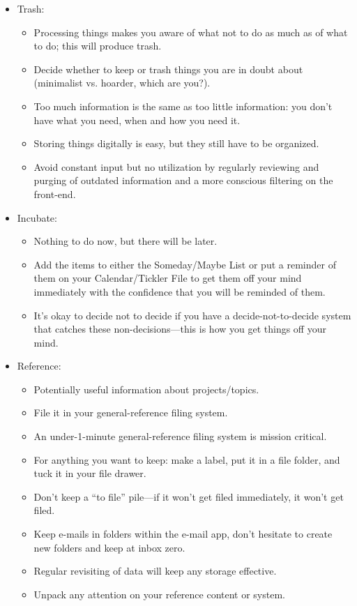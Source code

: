 \documentclass{article}
\begin{document}
\begin{itemize}
  \item Trash:
  \begin{itemize}
    \item Processing things makes you aware of what not to do as much as of what to do; this will produce trash.
    \item Decide whether to keep or trash things you are in doubt about (minimalist vs. hoarder, which are you?).
    \item Too much information is the same as too little information: you don't have what you need, when and how you need it.
    \item Storing things digitally is easy, but they still have to be organized.
    \item Avoid constant input but no utilization by regularly reviewing and purging of outdated information and a more conscious filtering on the front-end.
  \end{itemize}
  \item Incubate:
  \begin{itemize}
    \item Nothing to do now, but there will be later.
    \item Add the items to either the Someday/Maybe List or put a reminder of them on your Calendar/Tickler File to get them off your mind immediately with the confidence that you will be reminded of them.
    \item It's okay to decide not to decide if you have a decide-not-to-decide system that catches these non-decisions---this is how you get things off your mind.
  \end{itemize}
  \item Reference:
  \begin{itemize}
    \item Potentially useful information about projects/topics.
    \item File it in your general-reference filing system.
    \item An under-1-minute general-reference filing system is mission critical.
    \item For anything you want to keep: make a label, put it in a file folder, and tuck it in your file drawer.
    \item Don't keep a ``to file'' pile---if it won't get filed immediately, it won't get filed.
    \item Keep e-mails in folders within the e-mail app, don't hesitate to create new folders and keep at inbox zero.
    \item Regular revisiting of data will keep any storage effective.
    \item Unpack any attention on your reference content or system.
  \end{itemize}
\end{itemize}
\end{document}
